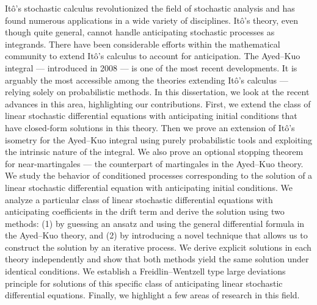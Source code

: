
Itô’s stochastic calculus revolutionized the field of stochastic analysis and has found numerous applications in a wide variety of disciplines. Itô’s theory, even though quite general, cannot handle anticipating stochastic processes as integrands. There have been considerable efforts within the mathematical community to extend Itô’s calculus to account for anticipation. The Ayed–Kuo integral — introduced in 2008 — is one of the most recent developments. It is arguably the most accessible among the theories extending Itô’s calculus — relying solely on probabilistic methods. In this dissertation, we look at the recent advances in this area, highlighting our contributions. First, we extend the class of linear stochastic differential equations with anticipating initial conditions that have closed-form solutions in this theory. Then we prove an extension of Itô’s isometry for the Ayed–Kuo integral using purely probabilistic tools and exploiting the intrinsic nature of the integral. We also prove an optional stopping theorem for near-martingales — the counterpart of martingales in the Ayed–Kuo theory. We study the behavior of conditioned processes corresponding to the solution of a linear stochastic differential equation with anticipating initial conditions. We analyze a particular class of linear stochastic differential equations with anticipating coefficients in the drift term and derive the solution using two methods: (1) by guessing an ansatz and using the general differential formula in the Ayed–Kuo theory, and (2) by introducing a novel  technique that allows us to construct the solution by an iterative process. We derive explicit solutions in each theory independently and show that both methods yield the same solution under identical conditions. We establish a Freidlin–Wentzell type large deviations principle for solutions of this specific class of anticipating linear stochastic differential equations. Finally, we highlight a few areas of research in this field.
